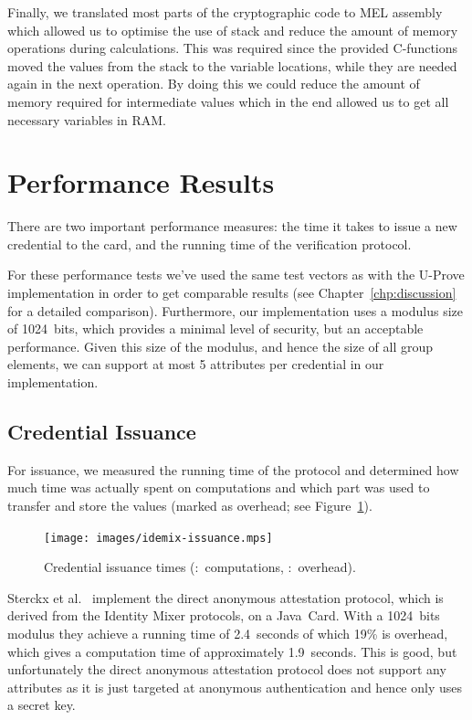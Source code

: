 Finally, we translated most parts of the cryptographic code to MEL assembly
which allowed us to optimise the use of stack and reduce the amount of memory
operations during calculations. This was required since the provided C-functions
moved the values from the stack to the variable locations, while they are needed
again in the next operation. By doing this we could reduce the amount of memory
required for intermediate values which in the end allowed us to get all
necessary variables in RAM.

\section{Performance Results\label{sec:IM-performance}}

There are two important performance measures: the time it takes to issue a new
credential to the card, and the running time of the verification protocol.

For these performance tests we've used the same test vectors as with the U-Prove
implementation in order to get comparable results (see
Chapter~\ref{chp:discussion} for a detailed comparison). Furthermore, our
implementation uses a modulus size of 1024~bits, which provides a minimal level
of security, but an acceptable performance. Given this size of the modulus, and
hence the size of all group elements, we can support at most 5 attributes per
credential in our implementation.

\subsection{Credential Issuance}

For issuance, we measured the running time of the protocol and determined how
much time was actually spent on computations and which part was used to transfer
and store the values (marked as overhead; see Figure~\ref{fig:issuance}).

\begin{figure}[b]
  \centering
  \texttt{[image: images/idemix-issuance.mps]}

  \caption[Credential issuance times.]{
    Credential issuance times
    (:~computations,
      :~overhead).}
  \label{fig:issuance}
\end{figure}

Sterckx et al.~\cite{Sterckx09} implement the direct anonymous attestation
protocol, which is derived from the Identity Mixer protocols, on a Java~Card.
With a 1024~bits modulus they achieve a running time of 2.4~seconds of which
19\% is overhead, which gives a computation time of approximately 1.9~seconds.
This is good, but unfortunately the direct anonymous attestation protocol does
not support any attributes as it is just targeted at anonymous authentication
and hence only uses a secret key.

